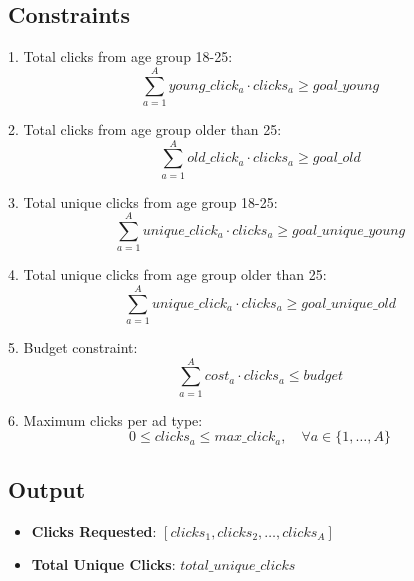 \documentclass{article}
\begin{document}
\subsection*{Constraints}
1. Total clicks from age group 18-25:
\[
\sum_{a=1}^{A} young\_click_{a} \cdot clicks_{a} \geq goal\_young
\]

2. Total clicks from age group older than 25:
\[
\sum_{a=1}^{A} old\_click_{a} \cdot clicks_{a} \geq goal\_old
\]

3. Total unique clicks from age group 18-25:
\[
\sum_{a=1}^{A} unique\_click_{a} \cdot clicks_{a} \geq goal\_unique\_young
\]

4. Total unique clicks from age group older than 25:
\[
\sum_{a=1}^{A} unique\_click_{a} \cdot clicks_{a} \geq goal\_unique\_old
\]

5. Budget constraint:
\[
\sum_{a=1}^{A} cost_{a} \cdot clicks_{a} \leq budget
\]

6. Maximum clicks per ad type:
\[
0 \leq clicks_{a} \leq max\_click_{a}, \quad \forall a \in \{1, \ldots, A\}
\]

\subsection*{Output}
\begin{itemize}
    \item \textbf{Clicks Requested}: $[clicks_{1}, clicks_{2}, \ldots, clicks_{A}]$
    \item \textbf{Total Unique Clicks}: $total\_unique\_clicks$
\end{itemize}
\end{document}
